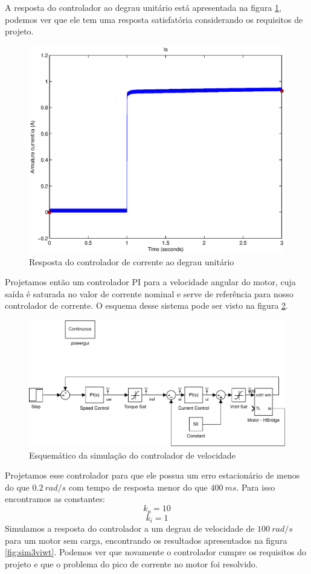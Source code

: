 \documentclass{article}
\begin{document}
A resposta do controlador ao degrau unitário está apresentada na figura \ref{fig:ia2}, podemos ver que ele tem uma resposta satisfatória considerando os requisitos de projeto.
\begin{figure}[H]
	\centering
	\includegraphics[width=0.7\linewidth]{matlab/ia2}
	\caption{Resposta do controlador de corrente ao degrau unitário}
	\label{fig:ia2}
\end{figure}

Projetamos então um controlador PI para a velocidade angular do motor, cuja saída é saturada no valor de corrente nominal e serve de referência para nosso controlador de corrente. O esquema desse sistema pode ser visto na figura \ref{fig:sim3}.

\begin{figure}[H]
	\centering
	\includegraphics[width=\linewidth]{matlab/sim3}
	\caption{Esquemático da simulação do controlador de velocidade}
	\label{fig:sim3}
\end{figure}

Projetamos esse controlador para que ele possua um erro estacionário de menos do que $0.2\ rad/s$ com tempo de resposta menor do que $400\ ms$. Para isso encontramos as constantes:
\begin{equation}
	k_p = 10
\end{equation}
\begin{equation}
	k_i = 1
\end{equation}
Simulamos a resposta do controlador a um degrau de velocidade de $100\ rad/s$ para um motor sem carga, encontrando os resultados apresentados na figura \ref{fig:sim3viwt}. Podemos ver que novamente o controlador cumpre os requisitos do projeto e que o problema do pico de corrente no motor foi resolvido.
\end{document}
